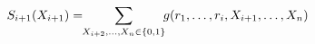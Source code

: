 \documentclass[preview]{standalone}
\begin{document}
\begin{align*}
\special{dvisvgm:raw <g id='unique000'>}S_{i+1}(X_{i+1}) = \!\!\sum_{X_{i+2},\ldots,X_n \in \{0,1\}}\!\! g(r_1,\ldots,r_i, X_{i+1},\ldots,X_n)\special{dvisvgm:raw </g>}
\end{align*}
\end{document}
